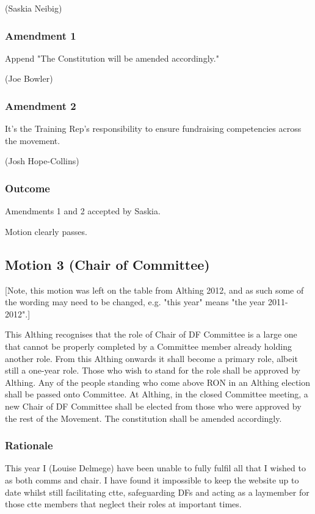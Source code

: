 \documentclass[a4paper, 11pt]{article} %
\begin{document}
(Saskia Neibig)

\subsubsection{Amendment 1}

Append "The Constitution will be amended accordingly."

(Joe Bowler)

\subsubsection{Amendment 2}

It's the Training Rep's responsibility to ensure fundraising competencies across the movement.

(Josh Hope-Collins)

\subsubsection{Outcome}
Amendments 1 and 2 accepted by Saskia.

Motion clearly passes.

\subsection{Motion 3 (Chair of Committee)}

[Note, this motion was left on the table from Althing 2012, and as such some of the wording may need to be changed, e.g. "this year" means "the year 2011-2012".]

This Althing recognises that the role of Chair of DF Committee is a large one that cannot be properly completed by a Committee member already holding another role.  From this Althing onwards it shall become a primary role, albeit still a one-year role.  Those who wish to stand for the role shall be approved by Althing. Any of the people standing who come above RON in an Althing election shall be passed onto Committee.  At Althing, in the closed Committee meeting, a new Chair of DF Committee shall be elected from those who were approved by the rest of the Movement.  The constitution shall be amended accordingly.

\subsubsection{Rationale}

This year I (Louise Delmege) have been unable to fully fulfil all that I wished to as both comms and chair. I have found it impossible to keep the website up to date whilst still facilitating ctte, safeguarding DFs and acting as a laymember for those ctte members that neglect their roles at important times.
\end{document}
